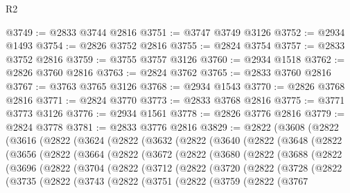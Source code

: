 \begin{lexlean}{R2}
\begin{coremodule}
@3749 := @2833 @3744 @2816
@3751 := @3747 @3749 @3126
@3752 := @2934 @1493
@3754 := @2826 @3752 @2816
@3755 := @2824 @3754
@3757 := @2833 @3752 @2816
@3759 := @3755 @3757 @3126
@3760 := @2934 @1518
@3762 := @2826 @3760 @2816
@3763 := @2824 @3762
@3765 := @2833 @3760 @2816
@3767 := @3763 @3765 @3126
@3768 := @2934 @1543
@3770 := @2826 @3768 @2816
@3771 := @2824 @3770
@3773 := @2833 @3768 @2816
@3775 := @3771 @3773 @3126
@3776 := @2934 @1561
@3778 := @2826 @3776 @2816
@3779 := @2824 @3778
@3781 := @2833 @3776 @2816
@3829 := @2822
    (@3608
      (@2822
        (@3616
          (@2822
            (@3624
              (@2822
                (@3632
                  (@2822
                    (@3640
                      (@2822
                        (@3648
                          (@2822
                            (@3656
                              (@2822
                                (@3664
                                  (@2822
                                    (@3672
                                      (@2822
                                        (@3680
                                          (@2822
                                            (@3688
                                              (@2822
                                                (@3696
                                                  (@2822
                                                    (@3704
                                                      (@2822
                                                        (@3712
                                                          (@2822
                                                            (@3720
                                                              (@2822
                                                                (@3728
                                                                  (@2822
                                                                    (@3735
                                                                      (@2822
                                                                        (@3743
                                                                          (@2822
                                                                            (@3751
                                                                              (@2822
                                                                                (@3759
                                                                                  (@2822
                                                                                    (@3767

\end{coremodule}
\end{lexlean}
